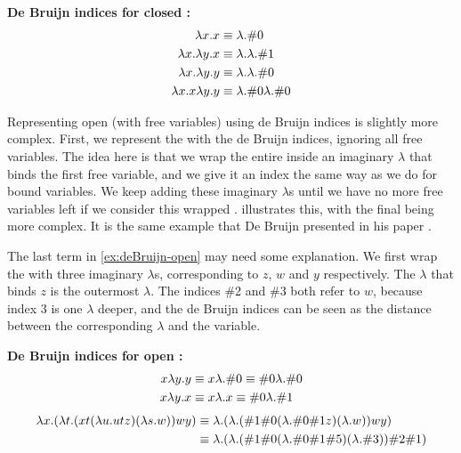 \begin{example}
  \label{ex:deBruijn-closed}
  \textbf{De Bruijn indices for closed \lterms:}
  \begin{align*}
    \lambda {x}.{x}                                  &\equiv \lambda {}.{\#0}                         \\
    \lambda {x}.{\lambda {y}.{x}}                        &\equiv \lambda {}.{\lambda {}.{\#1}}                \\
    \lambda {x}.{\lambda {y}.{y}}                        &\equiv \lambda {}.{\lambda {}.{\#0}}                \\
    \lambda {x}.{x}\lambda {y}.{y}                       &\equiv \lambda {}.{\#0}\lambda {}.{\#0}            
  \end{align*}
\end{example}

Representing open \lterms (\lterms with free variables) using de Bruijn indices is slightly more complex. 
First, we represent the \lterm with the de Bruijn indices, ignoring all free variables. The idea here is that we wrap the entire \lterm inside an imaginary $\lambda$ that binds the first free variable, 
and we give it an index the same way as we do for bound variables.
We keep adding these imaginary $\lambda$s until we have no more free variables left if we consider this wrapped \lterm.
 illustrates this, with the final \lterm being more complex. It is the same example that De Bruijn presented in his paper \cite{DEBRUIJN1972381}. 

The last term in \cref{ex:deBruijn-open} may need some explanation.
We first wrap the \lterm with three imaginary $\lambda$s, corresponding to $z$, $w$ and $y$ respectively. 
The $\lambda$ that binds $z$ is the outermost $\lambda$.
The indices \#2 and \#3 both refer to $w$, because index 3 is one $\lambda$ deeper, and
the de Bruijn indices can be seen as the distance between the corresponding $\lambda$ and the variable.
\begin{example}
  \label{ex:deBruijn-open}
  \textbf{De Bruijn indices for open \lterms:}
  \begin{align*}
    x\lambda {y}.{y}                                                    &\equiv x\lambda {}.{\#0}      \equiv \#0\lambda {}.{\#0}           \\
    x\lambda {y}.{x}                                                    &\equiv x\lambda {}.{x}        \equiv \#0\lambda {}.{\#1}           
  \end{align*}
  \begin{align*}
    \lambda {x}.{(}{\lambda {t}.{(}{x t (\lambda {u}.{u t z})(\lambda {s}.{w})})wy})    &\equiv \lambda {}.{(}{\lambda {}.{(}{\#1 \#0 (\lambda {}.{\#0 \#1 z})(\lambda {}.{w})})wy}) \\
                                                                    &\equiv \lambda {}.{(}{\lambda {}.{(}{\#1 \#0 (\lambda {}.{\#0 \#1 \#5})(\lambda {}.{\#3})})\#2\#1})    
  \end{align*} 
\end{example}

